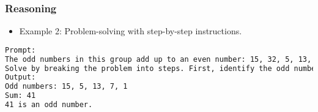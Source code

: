 \begin{frame}[fragile]\frametitle{Reasoning}
\begin{itemize}
    \item Example 2: Problem-solving with step-by-step instructions.
\end{itemize}
\begin{lstlisting}[language=HTML]
Prompt:
The odd numbers in this group add up to an even number: 15, 32, 5, 13, 82, 7, 1. 
Solve by breaking the problem into steps. First, identify the odd numbers, add them, and indicate whether the result is odd or even. 
Output:
Odd numbers: 15, 5, 13, 7, 1
Sum: 41 
41 is an odd number.
\end{lstlisting}
\end{frame}




		






		






